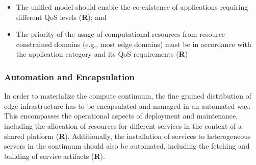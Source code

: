 \begin{itemize}
	\item The unified model should enable the co-existence of applications requiring different QoS levels (\textbf{R}); and
	
	\item The priority of the usage of computational resources from resource-constrained domains (e.g., most edge domains) must be in accordance with the application category and its QoS requirements (\textbf{R})
\end{itemize}


\subsubsection{Automation and Encapsulation}



In order to materialize the compute continuum, the fine grained distribution of edge infrastructure has to be encapsulated and managed in an automated way. This encompasses the operational aspects of deployment and maintenance, including the allocation of resources for different services in the context of a shared platform (\textbf{R}). 
Additionally, the installation of services to heterogeneous servers in the continuum should also be automated, including the fetching and building of service artifacts (\textbf{R}).







